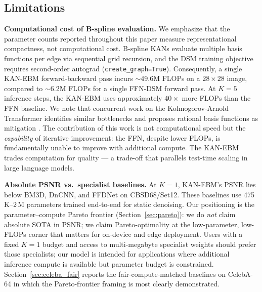 \documentclass{article}
\begin{document}
\subsection{Limitations}
\label{sec:limitations}

\textbf{Computational cost of B-spline evaluation.}
We emphasize that the parameter counts reported throughout this paper measure
representational compactness, not computational cost. B-spline KANs evaluate
multiple basis functions per edge via sequential grid recursion, and the DSM
training objective requires second-order autograd (\texttt{create\_graph=True}).
Consequently, a single KAN-EBM forward-backward pass incurs $\sim$49.6M FLOPs
on a $28{\times}28$ image, compared to $\sim$6.2M FLOPs for a single FFN-DSM
forward pass. At $K{=}5$ inference steps, the KAN-EBM uses approximately
$40{\times}$ more FLOPs than the FFN baseline. We note that concurrent work on
the Kolmogorov-Arnold Transformer identifies similar bottlenecks and proposes
rational basis functions as mitigation \citep{kat2024}. The contribution of
this work is not computational speed but the \emph{capability} of iterative
improvement: the FFN, despite lower FLOPs, is fundamentally unable to improve
with additional compute. The KAN-EBM trades computation for quality --- a
trade-off that parallels test-time scaling in large language models.

\textbf{Absolute PSNR vs.\ specialist baselines.} At $K{=}1$, KAN-EBM's PSNR
lies below BM3D, DnCNN, and FFDNet on CBSD68/Set12. These baselines use
475\,K--2\,M parameters trained end-to-end for static denoising. Our positioning
is the parameter--compute Pareto frontier (Section~\ref{sec:pareto}): we do
\emph{not} claim absolute SOTA in PSNR; we claim Pareto-optimality at the
low-parameter, low-FLOPs corner that matters for on-device and edge
deployment. Users with a fixed $K{=}1$ budget and access to multi-megabyte
specialist weights should prefer those specialists; our model is intended for
applications where additional inference compute is available but parameter
budget is constrained. Section~\ref{sec:celeba_fair} reports the
fair-compute-matched baselines on CelebA-64 in which the Pareto-frontier framing
is most clearly demonstrated.
\end{document}
